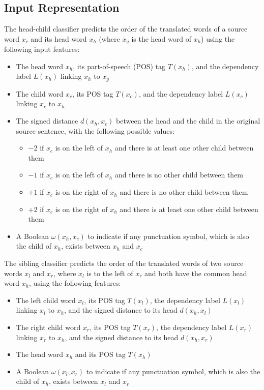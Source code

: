 \documentclass[letterpaper]{article}
\begin{document}
\subsection{Input Representation}
The head-child classifier predicts the order of the translated words of a source word $x_c$ and its head word $x_h$ (where $x_g$ is the head word of $x_h$) using the following input features:
\begin{itemize}
\item The head word $x_h$, its part-of-speech (POS) tag $T(x_h)$, and the dependency label $L(x_h)$ linking $x_h$ to $x_g$
\item The child word $x_c$, its POS tag $T(x_c)$, and the dependency label $L(x_c)$ linking $x_c$ to $x_h$
\item The signed distance $d(x_h,x_c)$ between the head and the child in the original source sentence, with the following possible values:
\begin{itemize}
\item $-2$ if $x_c$ is on the left of $x_h$ and there is at least one other child between them
\item $-1$ if $x_c$ is on the left of $x_h$ and there is no other child between them
\item $+1$ if $x_c$ is on the right of $x_h$ and there is no other child between them
\item $+2$ if $x_c$ is on the right of $x_h$ and there is at least one other child between them
\end{itemize}
\item A Boolean $\omega(x_h,x_c)$ to indicate if any punctuation symbol, which is also the child of $x_h$, exists between $x_h$ and $x_c$
\end{itemize}

The sibling classifier predicts the order of the translated words of two source words $x_l$ and $x_r$, where $x_l$ is to the left of $x_r$ and both have the common head word $x_h$, using the following features:
\begin{itemize}
\item The left child word $x_l$, its POS tag $T(x_l)$, the dependency label $L(x_l)$ linking $x_l$ to $x_h$, and the signed distance to its head $d(x_h,x_l)$ 
\item The right child word $x_r$, its POS tag $T(x_r)$, the dependency label $L(x_r)$ linking $x_r$ to $x_h$, and the signed distance to its head $d(x_h,x_r)$ 
\item The head word $x_h$ and its POS tag $T(x_h)$
\item A Boolean $\omega(x_l,x_r)$ to indicate if any punctuation symbol, which is also the child of $x_h$, exists between $x_l$ and $x_r$
\end{itemize}
\end{document}
